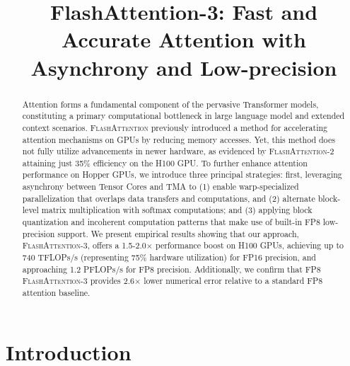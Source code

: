 \title{FlashAttention-3: Fast and Accurate Attention with Asynchrony and Low-precision}

\begin{abstract}
Attention forms a fundamental component of the pervasive Transformer models, constituting a primary computational bottleneck in large language model and extended context scenarios. \textsc{FlashAttention} previously introduced a method for accelerating attention mechanisms on GPUs by reducing memory accesses. Yet, this method does not fully utilize advancements in newer hardware, as evidenced by \textsc{FlashAttention-2} attaining just 35\% efficiency on the H100 GPU. To further enhance attention performance on Hopper GPUs, we introduce three principal strategies: first, leveraging asynchrony between Tensor Cores and TMA to (1) enable warp-specialized parallelization that overlaps data transfers and computations, and (2) alternate block-level matrix multiplication with softmax computations; and (3) applying block quantization and incoherent computation patterns that make use of built-in FP8 low-precision support. We present empirical results showing that our approach, \textsc{FlashAttention-3}, offers a 1.5-2.0$\times$ performance boost on H100 GPUs, achieving up to 740 TFLOPs/s (representing 75\% hardware utilization) for FP16 precision, and approaching 1.2 PFLOPs/s for FP8 precision. Additionally, we confirm that FP8 \textsc{FlashAttention-3} provides 2.6$\times$ lower numerical error relative to a standard FP8 attention baseline.
\end{abstract}

\section{Introduction}
\label{sec:intro}

